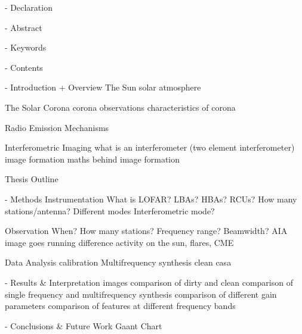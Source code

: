 %
%
%
%

- Declaration

- Abstract

- Keywords 

- Contents

- Introduction + Overview
		The Sun
        	solar atmosphere
        
		The Solar Corona
        	corona observations
            characteristics of corona
           
        Radio Emission Mechanisms
        	
           
           
        Interferometric Imaging
        	what is an interferometer (two element interferometer)
            image formation
            maths behind image formation
            
        Thesis Outline    
        
        
        

- Methods
		Instrumentation 
        	What is LOFAR?
            LBAs?
            HBAs?
            RCUs?
            How many stations/antenna?
            Different modes
			Interferometric mode?

		Observation
			When?
            How many stations?
            Frequency range?
            Beamwidth?
            AIA image
            goes
            running difference
            activity on the sun, flares, CME
            
         Data Analysis
         	calibration 
         	Multifrequency synthesis 
            clean 
            casa
            
                        
            
- Results & Interpretation
	images 
    comparison of dirty and clean
    comparison of single frequency and multifrequency synthesis
    comparison of different gain parameters
    comparison of features at different frequency bands



- Conclusions & Future Work
		Gaant Chart

















